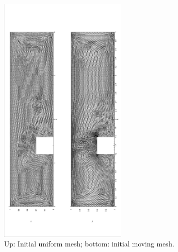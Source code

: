 \documentclass[a4paper, 11pt]{article}
\begin{document}
      \begin{figure}[!htbp]
        \begin{center}
        \includegraphics[width = 0.55\textwidth, angle = -90]{picture/step_flow_data/initial_mesh40_001.eps}
        \caption{\small Up: Initial uniform mesh; bottom: initial moving mesh.}
        \label{fig::step_initial_mesh}
        \end{center}
      \end{figure}
\end{document}
